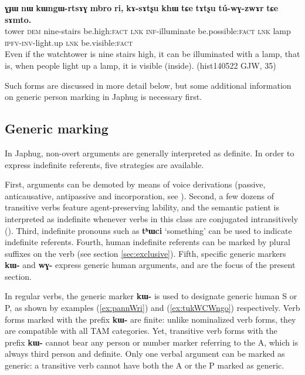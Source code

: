 \documentclass[oneside,a4paper,11pt]{article}
\newcommand{\ipa}[1]{\textbf{\phon\mbox{#1}}} %
\newcommand{\refb}[1]{(\ref{#1})}
\begin{document}
\begin{exe}
\ex  \label{ex:tuwGzwAr}
\gll \ipa{ɣɟɯ} 	\ipa{nɯ} 	\ipa{kɯngɯ-rtsɤɣ} 	\ipa{mbro} 	\ipa{ri,} 	\ipa{kɤ-sɤtʂu} 	\ipa{khɯ} 	\ipa{tɕe} 	\ipa{tɤtʂu} 	\ipa{tú-wɣ-zwɤr} 	\ipa{tɕe} 	\ipa{sɤmto.}  \\
tower \textsc{dem} nine-stairs be.high:\textsc{fact} \textsc{lnk} \textsc{inf}-illuminate be.possible:\textsc{fact} \textsc{lnk} lamp \textsc{ipfv-inv}-light.up \textsc{lnk} be.visible:\textsc{fact} \\
\glt Even if the watchtower is nine stairs high, it can be illuminated with a lamp, that is, when people light up a lamp, it is visible (inside). (hist140522 GJW, 35)
\end{exe}

Such forms are discussed in more detail below, but some additional information on generic person marking in Japhug is necessary first.

\subsection{Generic marking}  \label{sec:genr.jpg}

In Japhug, non-overt arguments are generally interpreted as definite. In order to express indefinite referents, five strategies are available. 

First, arguments can be demoted by means of voice derivations (passive, anticausative,  antipassive and incorporation, see \citealt{jacques12incorp, jacques14antipassive}). Second, a few dozens of transitive verbs feature agent-preserving lability, and the semantic patient is interpreted as indefinite whenever verbs in this class are conjugated intransitively (\citealt{jacques12demotion}).  Third, indefinite pronouns such as \ipa{tʰɯci} `something'  can be used to indicate indefinite referents. Fourth, human indefinite referents can be marked by plural suffixes on the verb (see section \ref{sec:exclusive}). Fifth, specific generic markers \ipa{kɯ-} and \ipa{wɣ-} express generic human arguments, and are the focus of the present section. 

In regular verbs, the generic marker \ipa{kɯ-} is used to designate generic human S or P, as shown by examples \refb{ex:pannWri} and \refb{ex:tukWCWngo} respectively. Verb forms marked with the prefix \ipa{kɯ-} are  finite: unlike nominalized verb forms, they are compatible with all TAM categories. Yet, transitive verb forms with the prefix \ipa{kɯ-} cannot bear any person or number marker referring to the A, which is always third person and definite. Only one verbal argument can be marked as generic: a transitive verb cannot have both the A or the P marked as generic.
\end{document}
